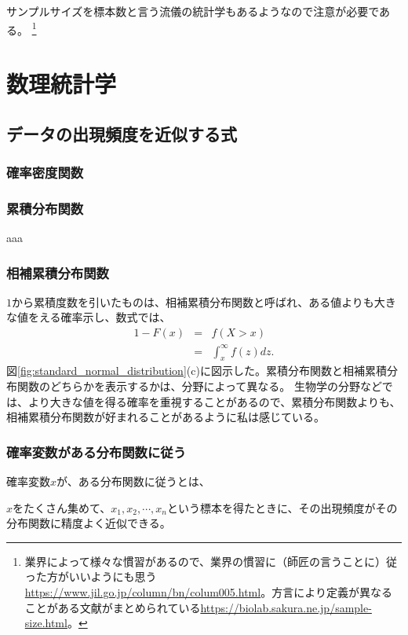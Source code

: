 \documentclass[a4paper,11pt,dvipdfmx]{jsarticle}
\begin{document}
サンプルサイズを標本数と言う流儀の統計学もあるようなので注意が必要である。
\footnote{ 業界によって様々な慣習があるので、業界の慣習に（師匠の言うことに）従った方がいいようにも思う\url{https://www.jil.go.jp/column/bn/colum005.html}。方言により定義が異なることがある文献がまとめられている\url{https://biolab.sakura.ne.jp/sample-size.html}。}

\section{数理統計学 }
\subsection{データの出現頻度を近似する式}

\subsubsection{確率密度関数}

\subsubsection{累積分布関数}
aaa

\subsubsection{相補累積分布関数}
$1$から累積度数を引いたものは、相補累積分布関数と呼ばれ、ある値よりも大きな値をえる確率示し、数式では、
\begin{eqnarray}
    1-F(x) &=& f(X>x) \\
        &=& \int_{x}^{\infty} f(z)dz.
\end{eqnarray}
図\ref{fig:standard_normal_distribution}(c)に図示した。累積分布関数と相補累積分布関数のどちらかを表示するかは、分野によって異なる。
生物学の分野などでは、より大きな値を得る確率を重視することがあるので、累積分布関数よりも、相補累積分布関数が好まれることがあるように私は感じている。

\subsubsection{確率変数がある分布関数に従う}
確率変数$x$が、ある分布関数に従うとは、

$x$をたくさん集めて、$x_1,x_2,\cdots,x_n$という標本を得たときに、その出現頻度がその分布関数に精度よく近似できる。
\end{document}
